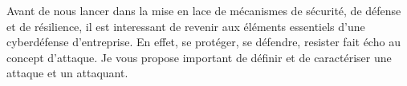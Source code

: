 %
%


Avant de nous lancer dans la mise en lace de mécanismes de sécurité, de défense et de résilience, il est interessant de revenir aux éléments essentiels d'une cyberdéfense d'entreprise. En effet, se protéger, se défendre, resister fait écho au concept d'attaque. Je vous propose important de définir et de caractériser une attaque et un attaquant. 

\utocomplete